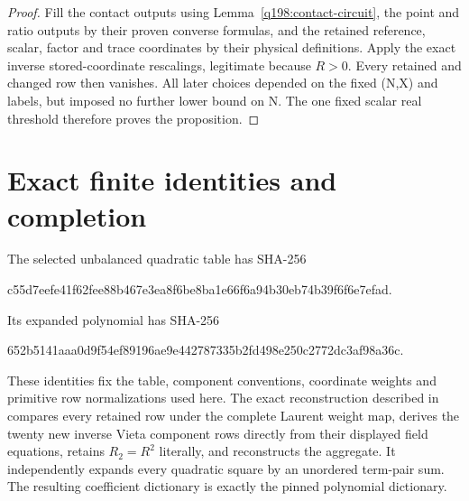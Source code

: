 \begin{proof}
Fill the contact outputs using Lemma~\ref{q198:contact-circuit},
the point and ratio outputs by their proven converse formulas, and
the retained reference, scalar, factor and trace coordinates by
their physical definitions. Apply the exact inverse stored-coordinate
rescalings, legitimate because $R>0$. Every retained and changed
row then vanishes. All later choices depended on the fixed (N,X)
and labels, but imposed no further lower bound on N. The one fixed
scalar real threshold therefore proves the proposition.
\end{proof}

\section{Exact finite identities and completion}\label{q198:finite-certificate}
The selected unbalanced quadratic table has SHA-256
\begin{center}\small\ttfamily
c55d7eefe41f62fee88b467e3ea8f6be8ba1e66f6a94b30eb74b39f6f6e7efad.
\end{center}
Its expanded polynomial has SHA-256
\begin{center}\small\ttfamily
652b5141aaa0d9f54ef89196ae9e442787335b2fd498e250c2772dc3af98a36c.
\end{center}
These identities fix the table, component conventions, coordinate
weights and primitive row normalizations used here.
The exact reconstruction described in \cite{q198-FiniteReconstruction}
compares every retained row under the complete Laurent weight map,
derives the twenty new inverse Vieta component rows directly from
their displayed field equations, retains $R_2=R^2$ literally,
and reconstructs the aggregate. It independently expands every
quadratic square by an unordered term-pair sum. The resulting
coefficient dictionary is exactly the pinned polynomial dictionary.

